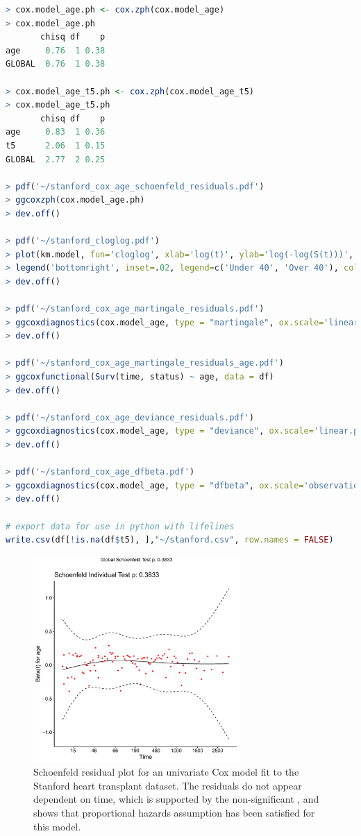 \begin{lstlisting}[language=R]
> cox.model_age.ph <- cox.zph(cox.model_age)
> cox.model_age.ph
       chisq df    p
age     0.76  1 0.38
GLOBAL  0.76  1 0.38

> cox.model_age_t5.ph <- cox.zph(cox.model_age_t5)
> cox.model_age_t5.ph
       chisq df    p
age     0.83  1 0.36
t5      2.06  1 0.15
GLOBAL  2.77  2 0.25

> pdf('~/stanford_cox_age_schoenfeld_residuals.pdf')
> ggcoxzph(cox.model_age.ph)
> dev.off()

> pdf('~/stanford_cloglog.pdf')
> plot(km.model, fun='cloglog', xlab='log(t)', ylab='log(-log(S(t)))', col=c('#4e79a7', '#f28e2b'))
> legend('bottomright', inset=.02, legend=c('Under 40', 'Over 40'), col=c('#4e79a7', '#f28e2b'), lty=1:2, box.lty=0)
> dev.off()

> pdf('~/stanford_cox_age_martingale_residuals.pdf')
> ggcoxdiagnostics(cox.model_age, type = "martingale", ox.scale='linear.predictions')
> dev.off()

> pdf('~/stanford_cox_age_martingale_residuals_age.pdf')
> ggcoxfunctional(Surv(time, status) ~ age, data = df)
> dev.off()

> pdf('~/stanford_cox_age_deviance_residuals.pdf')
> ggcoxdiagnostics(cox.model_age, type = "deviance", ox.scale='linear.predictions')
> dev.off()

> pdf('~/stanford_cox_age_dfbeta.pdf')
> ggcoxdiagnostics(cox.model_age, type = "dfbeta", ox.scale='observation.id')
> dev.off()

# export data for use in python with lifelines
write.csv(df[!is.na(df$t5), ],"~/stanford.csv", row.names = FALSE)
\end{lstlisting}

\begin{figure}[H]
\centering
\includegraphics[width=0.7\textwidth]{figures/survival/stanford_cox_age_schoenfeld_residuals}
\vspace{0.2cm}
\caption{
Schoenfeld residual plot for
an univariate Cox model fit to the Stanford heart transplant dataset.
The residuals do not appear dependent on time,
which is supported by the non-significant \pvalue,
and shows that proportional hazards assumption
has been satisfied for this model.
}
\label{fig:cox:schoenfeld_residuals}
\end{figure}

